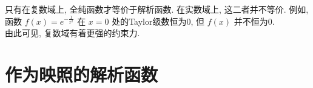         \begin{rmk}
            [Dedicatia]
            只有在复数域上, 全纯函数才等价于解析函数. 在实数域上, 这二者并不等价. 例如, 函数 \(f(x)=e^{-\frac{1}{x^2}}\) 在 \(x=0\) 处的Taylor级数恒为0, 但 \(f(x)\) 并不恒为0.\\
            由此可见, 复数域有着更强的约束力.
        \end{rmk}

\section{作为映照的解析函数}




